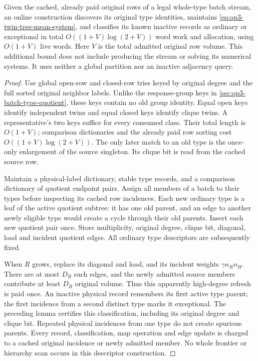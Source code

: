 \begin{proposition}
\label{prop:op3-paid-twin-tree-descriptors}
Given the cached, already paid original rows of a legal whole-type batch
stream, an online construction discovers its original type identities,
maintains \eqref{eq:op3-twin-tree-mean-system}, and classifies its known
inactive records as ordinary or exceptional in total
$O((1+V)\log(2+V))$ word work and allocation, using $O(1+V)$ live words.
Here $V$ is the total admitted original row volume. This additional bound
does not include producing the stream or solving its numerical systems.
It uses neither a global partition nor an inactive adjacency query.
\end{proposition}
\begin{proof}
Use global open-row and closed-row tries keyed by original degree and the
full sorted original neighbor labels. Unlike the response-group keys in
\cref{sec:op3-batch-type-quotient}, these keys contain no old group identity.
Equal open keys identify independent twins and equal closed keys identify
clique twins. A representative's two keys suffice for every consumed
class. Their total length is $O(1+V)$; comparison dictionaries and the
already paid row sorting cost $O((1+V)\log(2+V))$. The only later match
to an old type is the once-only enlargement of the source singleton.
Its clique bit is read from the cached source row.

Maintain a physical-label dictionary, stable type records, and a
comparison dictionary of quotient endpoint pairs. Assign all members of a
batch to their types before inspecting its cached row incidences. Each
new ordinary type is a leaf of the active quotient subtree: it has one
old parent, and an edge to another newly eligible type would create a cycle
through their old parents. Insert each new quotient pair once. Store
multiplicity, original degree, clique bit, diagonal, load and incident
quotient edges. All ordinary type descriptors are subsequently fixed.

When $R$ grows, replace its diagonal and load, and its incident weights
$\gamma n_Rn_H$. There are at most $D_R$ such edges, and the newly admitted
source members contribute at least $D_R$ original volume. Thus this
apparently high-degree refresh is paid once. An inactive physical record
remembers its first active type parent; the first incidence from a second
distinct type marks it exceptional. The preceding lemma certifies this
classification, including its original degree and clique bit. Repeated
physical incidences from one type do not create spurious parents. Every
record, classification, map operation and edge update is charged to a
cached original incidence or newly admitted member. No whole frontier or
hierarchy scan occurs in this descriptor construction.
\end{proof}

